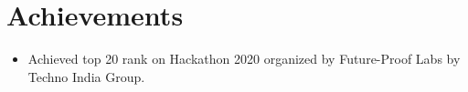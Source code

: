 \section{Achievements}
\begin{itemize} %
    \item Achieved top 20 rank on Hackathon 2020 organized by Future-Proof Labs by Techno India Group.
\end{itemize} %
